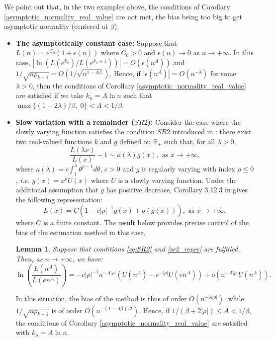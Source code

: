\documentclass[sn-mathphys-ay]{sn-jnl}%
\newtheorem{lemma}{Lemma}[section]
\begin{document}
We point out that, in the two examples above, the conditions of Corollary
\ref{asymptotic_normality_real_value} are not met, the bias being too big to get
asymptotic normality (centered at \(\beta\)).

\begin{itemize}
    \item \textbf{The asymptotically constant case:} Suppose that \(L(n)=e^{C_0}(1+\epsilon{(n)})\) where \(C_0>0\) and \(\epsilon(n)\to 0\) as $n\to +\infty$. In this case,
          $| \ln(L(e^{k_n})/L(e^{k_n+1}))|= O(\epsilon(n^A))$ and \(1/\sqrt{np_{k+1}}=O(1/ \sqrt{n^{1-A\beta}})\).
          Hence, if \(| \epsilon( n^A )|= O( n^{-\lambda})\)
          for some \(\lambda>0\), then the conditions of Corollary \ref{asymptotic_normality_real_value} are satisfied if we take \(k_n=A\ln n\) such that
          \(\max\{ (1-2\lambda)/\beta,\; 0 \}< A < 1/\beta\).
    \item \textbf{Slow variation with a remainder (\(SR2\)):} Consider the case where the slowly varying
          function satisfies the condition \(SR2\) introduced in \cite{Bingham1987}: there exist two real-valued functions \(k\) and \(g\) defined on $\mathbb{R}_+$ such that, for all $\lambda>0$,
          \begin{equation}\label{eq:SR2}
              \frac{L(\lambda x)}{L(x)}-1 \sim \kappa(\lambda)g(x), \text{ as } x\to+\infty,
          \end{equation}
          where \(\kappa (\lambda)=c\int_1^{\lambda}{{\theta}^{\rho-1}d\theta}\), $c>0$ and \(g\) is regularly varying with index \(\rho\leq 0\), \textit{i.e.} \(g(x)=x^\rho U(x)\) where \(U\) is a slowly varying function.
          Under the additional assumption
          that \(g\) has positive decrease, Corollary 3.12.3 in \cite{Bingham1987} gives the following representation:
          \begin{equation}\label{sr2_repre}
              L(x)=C\left( 1-c|\rho|^{-1}g(x)+o\left(g \left(x\right) \right) \right), \text{ as } x\to +\infty,
          \end{equation}
          where \(C\) is a finite constant. The result below provides precise
          control of the bias of the estimation method in this case.

          \begin{lemma}\label{bias_sr2} Suppose that conditions \eqref{eq:SR2} and \eqref{sr2_repre} are fulfilled. Then, as $n\to +\infty$, we have:
              \begin{equation*}
                  \ln\left(\frac{L\left(n^A\right)}{L\left(en^A\right)}\right)=-c|\rho|^{-1}n^{-A|\rho|}\left( U\left(n^A\right)-e^{-|\rho|}U\left( en^A \right) \right) + o\left(n^{-A|\rho|}U\left(n^A\right)\right).
              \end{equation*}
          \end{lemma}

          In this situation, the bias of the method is thus of order \(O(n^{-A|\rho|})\),
          while $1/\sqrt{np_{k+1}}$ is of order \(O(n^{-(1-A\beta)/2})\). Hence, if
          \(1/(\beta+2|\rho|)\leq A<1/\beta\), the conditions of Corollary
          \ref{asymptotic_normality_real_value} are satisfied with \(k_n=A\ln n\).
\end{itemize}
\end{document}
